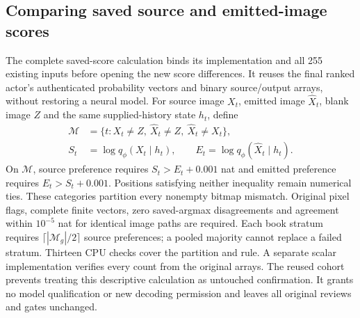 \subsection*{Comparing saved source and emitted-image scores}

The complete saved-score calculation binds its implementation and all 255
existing inputs before opening the new score differences. It reuses the final
ranked actor's authenticated probability vectors and binary source/output
arrays, without restoring a neural model. For source image $X_t$, emitted image
$\widehat X_t$, blank image $Z$ and the same supplied-history state $h_t$, define
\begin{equation}
 \begin{aligned}
 \mathcal M&=\{t:X_t\ne Z,\ \widehat X_t\ne Z,\ \widehat X_t\ne X_t\},\\
 S_t&=\log q_\phi(X_t\mid h_t),\qquad
 E_t=\log q_\phi(\widehat X_t\mid h_t).
 \end{aligned}
 \label{eq:saved-glyph-score-gap}
\end{equation}
On $\mathcal M$, source preference requires $S_t>E_t+0.001$ nat and emitted
preference requires $E_t>S_t+0.001$. Positions satisfying neither inequality
remain numerical ties.
These categories partition every nonempty bitmap mismatch. Original pixel
flags, complete finite vectors, zero saved-argmax disagreements and agreement
within $10^{-5}$ nat for identical image paths are required. Each book stratum
requires $\lceil|\mathcal M_g|/2\rceil$ source preferences; a pooled majority
cannot replace a failed stratum. Thirteen CPU checks cover the partition and
rule. A separate scalar implementation verifies every count from the original
arrays. The reused cohort prevents treating this descriptive calculation as
untouched confirmation. It grants no model qualification or new decoding
permission and leaves all original reviews and gates unchanged.
